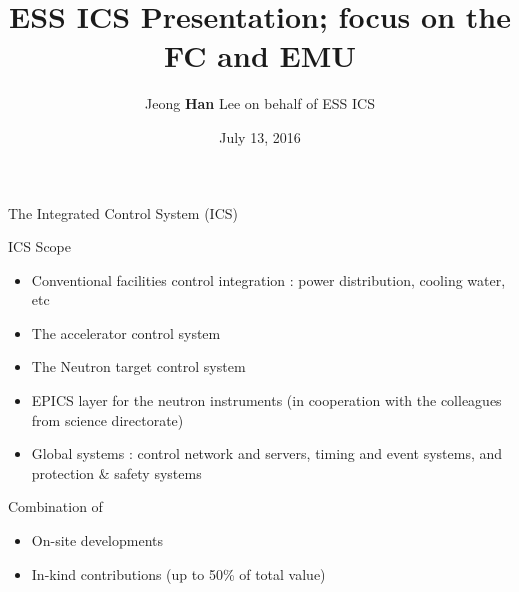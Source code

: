 \documentclass[
  9pt
  , table
  , ignorenonframetext
]{beamer}
\title{ESS ICS Presentation; focus on the FC and EMU}
\author{Jeong \textbf{Han} Lee on behalf of ESS ICS}%
\institute{
  Integrated Control System Division\\
  \textbf{ESS}, Sweden
}
\date{July 13, 2016}
\begin{document}
 
\begin{frame}[plain]
  \titlepage
\end{frame}


\begin{frame}{The Integrated Control System (ICS)}
  \begin{block}{ICS Scope}
    \begin{itemize}
    \item Conventional facilities control integration : power distribution, cooling water, etc
    \item The accelerator control system
    \item The Neutron target control system
    \item EPICS layer for the neutron instruments (in cooperation with the colleagues from science directorate)
    \item Global systems : control network and servers, timing and event systems, and protection \& safety systems
    \end{itemize}
  \end{block}
  \begin{exampleblock}{Combination of}
    \begin{itemize}
    \item On-site developments 
    \item In-kind contributions (up to 50\% of total value)
    \end{itemize}
  \end{exampleblock}
\end{frame}
\end{document}
